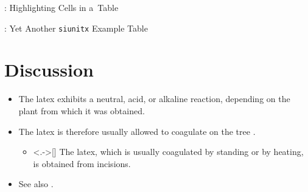 \begin{frame}{\titleprefix: Highlighting Cells in a~Table}


\smallskip
\begin{table}
	\caption{%
		\textit{tabularray} makes it simple to highlight cells, rows, or columns in a~table.%
	}
	\vspace{-\smallskipamount}%
	\resizebox*{!}{0.67\textheight}{%
	}
\end{table}

\end{frame}


\begin{frame}{\titleprefix: Yet Another \texttt{siunitx} Example Table}

\smallskip
\begin{table}
	\caption{Figure grouping via \texttt{siunitx} in a~table.}
	\vspace{-\smallskipamount}%
	
\end{table}

\end{frame}


\section{Discussion}


\begin{frame}{\titleprefix}

\begin{itemize}[<+->]
	\item The latex exhibits a neutral, acid, or alkaline reaction, depending on the plant from which it was obtained.
	\item The latex is therefore usually allowed to coagulate on the tree \citep{Koszegi2013}.
		\begin{itemize}
			\item<.->[\raisebox{0.75pt}{\scalebox{0.86}{$\Rightarrow$}}\!] The latex, which is usually coagulated by standing or by heating, is obtained from incisions.
		\end{itemize}
	\item See also \cite{Bursztyn2025, Bordalo2013, Dohmen2012}.
\end{itemize}

\end{frame}


